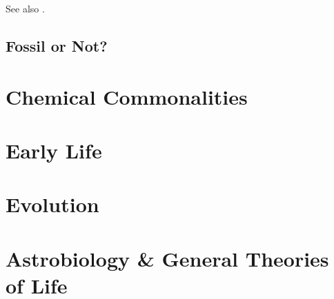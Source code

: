 \documentclass[]{article}
\begin{document}
\begin{figure}[H]
\begin{subfigure}[b]{0.3\textwidth}
\end{subfigure}
	
	
\end{figure}

See also \cite{ault2003dynamics}.


\subsection{Fossil or Not?}


\section{Chemical Commonalities}

\section{Early Life}

\section{Evolution}

\section{Astrobiology \& General Theories of Life}


\printunsrtglossaries

 


\end{document}
